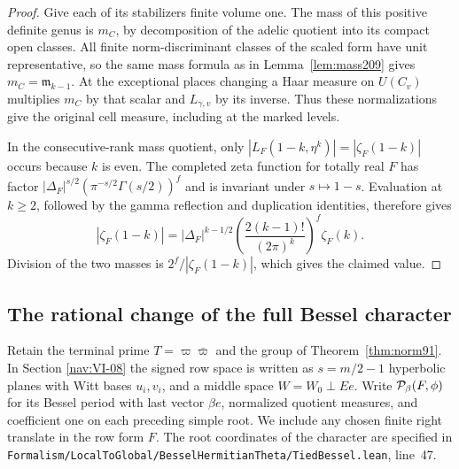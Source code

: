 \documentclass[a4paper,11pt]{article}
\theoremstyle{definition}
\theoremstyle{remark}
\newcommand{\srcloc}[2]{{\small\nolinkurl{#1.lean}}, line~#2}
\numberwithin{equation}{section}
\begin{document}
\begin{proof}
Give each of its stabilizers finite volume one. The mass of
this positive definite genus is \(m_C\), by decomposition of
the adelic quotient into its compact open classes. All finite
norm-discriminant classes of the scaled form have unit representative,
so the same mass formula as in Lemma~\ref{lem:mass209} gives
\(m_C=\mathfrak m_{k-1}\).
At the exceptional places changing a Haar measure on \(U(C_v)\)
multiplies \(m_C\) by that scalar and \(L_{\gamma,v}\) by its
inverse. Thus these normalizations give the original cell
measure, including at the marked levels.

In the consecutive-rank mass quotient, only
\(|L_F(1-k,\eta^k)|=|\zeta_F(1-k)|\) occurs because \(k\) is even.
The completed zeta function for totally real \(F\) has factor
\(|\Delta_F|^{s/2}(\pi^{-s/2}\Gamma(s/2))^f\) and is invariant
under \(s\mapsto1-s\). Evaluation at \(k\ge2\), followed by the
gamma reflection and duplication identities, therefore gives
\[
 |\zeta_F(1-k)|=|\Delta_F|^{k-1/2}
       \left(\frac{2(k-1)!}{(2\pi)^k}\right)^f\zeta_F(k).
\]
Division of the two masses is \(2^f/|\zeta_F(1-k)|\), which
gives the claimed value.
\end{proof}

\subsection{The rational change of the full Bessel character}\label{nav:VI-24}
Retain the terminal prime \(T=\varpi\bar\varpi\) and the group of
Theorem~\ref{thm:norm91}. In
Section \ref{nav:VI-08} the
signed row space is written as \(s=m/2-1\) hyperbolic planes with
Witt bases \(u_i,v_i\), and a middle space \(W=W_0\perp Ee\).
Write \({\cal P}_\beta(F,\phi)\) for its Bessel period with last
vector \(\beta e\), normalized quotient measures, and coefficient
one on each preceding simple root. We include any chosen finite
right translate in the row form \(F\). The root coordinates of the
character are specified in
\srcloc{Formalism/LocalToGlobal/BesselHermitianTheta/TiedBessel}{47}.
\end{document}
